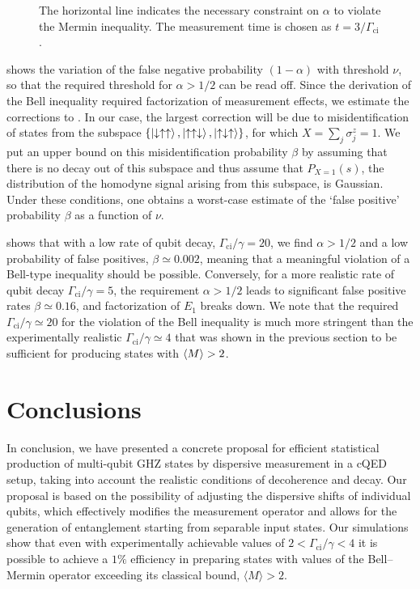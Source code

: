 \begin{figure}
\centering
{}
\caption[False positive and false negative rates versus threshold]
{ The horizontal line indicates the necessary constraint on $\alpha$ to violate the Mermin inequality. The measurement time is chosen as $t = 3 / \Gamma_{\text{ci}}$.\label{fig:figure5}}
\end{figure}%
 shows the variation of the false negative probability $(1-\alpha)$ with threshold $\nu$, so that the required threshold for $\alpha>1/2$ can be read off. Since the derivation of the Bell inequality required factorization of measurement effects, we estimate the corrections to . In our case, the largest correction will be due to misidentification of states from the subspace $\{\left\lvert \downarrow\uparrow\uparrow \right\rangle, \left\lvert \uparrow\uparrow\downarrow \right\rangle,\left\lvert \uparrow\downarrow\uparrow \right\rangle\}$, for which $X=\sum_j \sigma^z_j=1$. We put an upper bound on this misidentification probability $\beta$ by assuming that there is no decay out of this subspace and thus assume that $P_{X=1}(s)$, the distribution of the homodyne signal arising from this subspace, is Gaussian. Under these conditions, one obtains a worst-case estimate of the `false positive' probability $\beta$ as a function of $\nu$.

 shows that with a low rate of qubit decay, $\Gamma_\text{ci}/\gamma=20$, we find $\alpha>1/2$ and a low probability of false positives, $\beta\simeq 0.002$, meaning that a meaningful violation of a Bell-type inequality should be possible. Conversely, for a more realistic rate of qubit decay $\Gamma_\text{ci}/\gamma=5$, the requirement $\alpha>1/2$ leads to significant false positive rates $\beta\simeq 0.16$, and factorization of $E_1$ breaks down. We note that the required $\Gamma_\text{ci}/\gamma\simeq 20$ for the violation of the Bell inequality is much more stringent than the experimentally realistic $\Gamma_\text{ci}/\gamma\simeq 4$ that was shown in the previous section to be sufficient for producing states with $\langle M\rangle>2$.

\section{Conclusions\label{sec:conclusions}}
In conclusion, we have presented a concrete proposal for efficient statistical production of multi-qubit GHZ states by dispersive measurement in a cQED setup, taking into account the realistic conditions of decoherence and decay. Our proposal is based on the possibility of adjusting the dispersive shifts of individual qubits, which effectively modifies the measurement operator and allows for the generation of entanglement starting from separable input states. Our simulations show that even with experimentally achievable values of $2<\Gamma_\text{ci}/\gamma<4$ it is possible to achieve a $1\%$ efficiency in preparing states with values of the Bell--Mermin operator exceeding its classical bound, $\langle M \rangle>2$.

